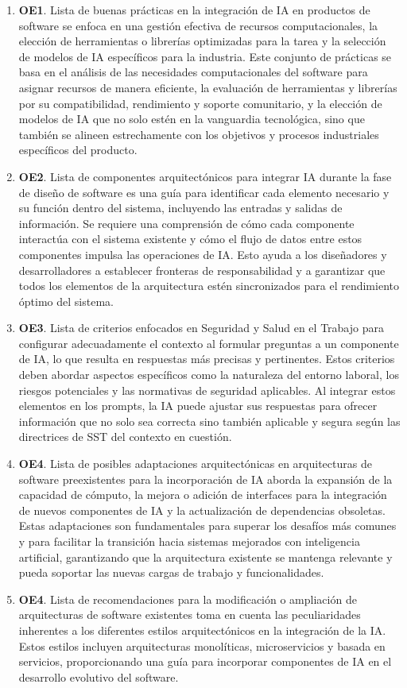 \begin{enumerate}[label=\textbf{R\arabic*:}]
    \item \textbf{OE1}. Lista de buenas prácticas en la integración de IA en productos de software se enfoca en una gestión efectiva de recursos computacionales, la elección de herramientas o librerías optimizadas para la tarea y la selección de modelos de IA específicos para la industria. Este conjunto de prácticas se basa en el análisis de las necesidades computacionales del software para asignar recursos de manera eficiente, la evaluación de herramientas y librerías por su compatibilidad, rendimiento y soporte comunitario, y la elección de modelos de IA que no solo estén en la vanguardia tecnológica, sino que también se alineen estrechamente con los objetivos y procesos industriales específicos del producto.
    \item \textbf{OE2}. Lista de componentes arquitectónicos para integrar IA durante la fase de diseño de software es una guía para identificar cada elemento necesario y su función dentro del sistema, incluyendo las entradas y salidas de información. Se requiere una comprensión de cómo cada componente interactúa con el sistema existente y cómo el flujo de datos entre estos componentes impulsa las operaciones de IA. Esto ayuda a los diseñadores y desarrolladores a establecer fronteras de responsabilidad y a garantizar que todos los elementos de la arquitectura estén sincronizados para el rendimiento óptimo del sistema.
    \item \textbf{OE3}. Lista de criterios enfocados en Seguridad y Salud en el Trabajo para configurar adecuadamente el contexto al formular preguntas a un componente de IA, lo que resulta en respuestas más precisas y pertinentes. Estos criterios deben abordar aspectos específicos como la naturaleza del entorno laboral, los riesgos potenciales y las normativas de seguridad aplicables. Al integrar estos elementos en los prompts, la IA puede ajustar sus respuestas para ofrecer información que no solo sea correcta sino también aplicable y segura según las directrices de SST del contexto en cuestión.
    \item \textbf{OE4}. Lista de posibles adaptaciones arquitectónicas en arquitecturas de software preexistentes para la incorporación de IA aborda la expansión de la capacidad de cómputo, la mejora o adición de interfaces para la integración de nuevos componentes de IA y la actualización de dependencias obsoletas. Estas adaptaciones son fundamentales para superar los desafíos más comunes y para facilitar la transición hacia sistemas mejorados con inteligencia artificial, garantizando que la arquitectura existente se mantenga relevante y pueda soportar las nuevas cargas de trabajo y funcionalidades.
    \item \textbf{OE4}. Lista de recomendaciones para la modificación o ampliación de arquitecturas de software existentes toma en cuenta las peculiaridades inherentes a los diferentes estilos arquitectónicos en la integración de la IA. Estos estilos incluyen arquitecturas monolíticas, microservicios y basada en servicios, proporcionando una guía para incorporar componentes de IA en el desarrollo evolutivo del software.
\end{enumerate}


